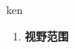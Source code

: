 
\begin{frame}
{\huge ken}
\begin{center}
\begin{enumerate}\Large
  \item \textbf{视野范围}
\end{enumerate}
\end{center}
\end{frame}
